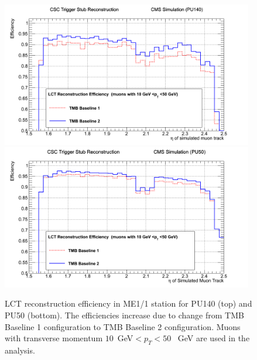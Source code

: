 \begin{figure} [h!]
\includegraphics[width=0.98\textwidth]{figures/PU140_Improv_from1_to_2.png}
\includegraphics[width=0.98\textwidth]{figures/PU50_Improv_from1_to_2.png}
\caption{LCT reconstruction efficiency in ME1/1 station for PU140 (top) and PU50 (bottom). The efficiencies increase due to change from TMB Baseline 1 configuration to TMB Baseline 2 configuration. Muons with transverse momentum $10$~GeV$<p_T<50$~ GeV are used in the analysis.}
\label{fig:From1to2}
\end{figure}
